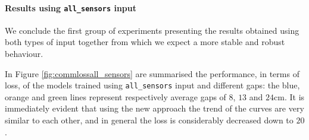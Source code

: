 \paragraph*{Results using \texttt{all\_sensors} input}
We conclude the first group of experiments presenting the results obtained using 
both types of input together from which we expect a more stable and robust 
behaviour.

In Figure \ref{fig:commlossall_sensors} are summarised the performance, 
in terms of loss, of the models trained using \texttt{all\_sensors} input and 
different gaps: the blue, orange and green lines represent respectively average 
gaps of $8$, $13$ and $24$\gls{cm}.
It is immediately evident that using the new approach the trend of the curves are 
very similar to each other, and in general the loss is considerably decreased down 
to $20$.
